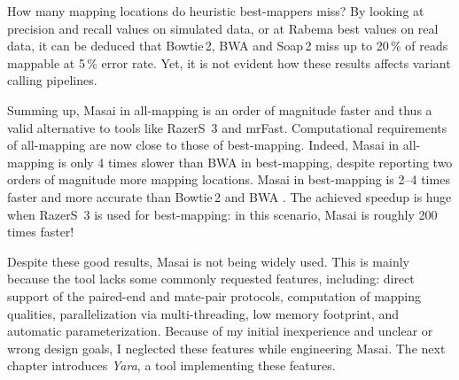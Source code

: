 How many mapping locations do heuristic best-mappers miss?
By looking at precision and recall values on simulated data, or at Rabema best values on real data, it can be deduced that Bowtie\,2, BWA and Soap\,2 miss up to 20\,\% of reads mappable at 5\,\% error rate.
Yet, it is not evident how these results affects variant calling pipelines.

Summing up, Masai in all-mapping is an order of magnitude faster and thus a valid alternative to tools like RazerS~3 and mrFast.
Computational requirements of all-mapping are now close to those of best-mapping.
Indeed, Masai in all-mapping is only 4 times slower than BWA in best-mapping, despite reporting two orders of magnitude more mapping locations.
Masai in best-mapping is 2--4 times faster and more accurate than Bowtie\,2 \citep{Langmead2012} and BWA \citep{Li2009}.
The achieved speedup is huge when RazerS~3 is used for best-mapping: in this scenario, Masai is roughly 200 times faster!

Despite these good results, Masai is not being widely used.
This is mainly because the tool lacks some commonly requested features, including:
direct support of the paired-end and mate-pair protocols, computation of mapping qualities, parallelization via multi-threading, low memory footprint, and automatic parameterization.
Because of my initial inexperience and unclear or wrong design goals, I neglected these features while engineering Masai.
The next chapter introduces \emph{Yara}, a tool implementing these features.
